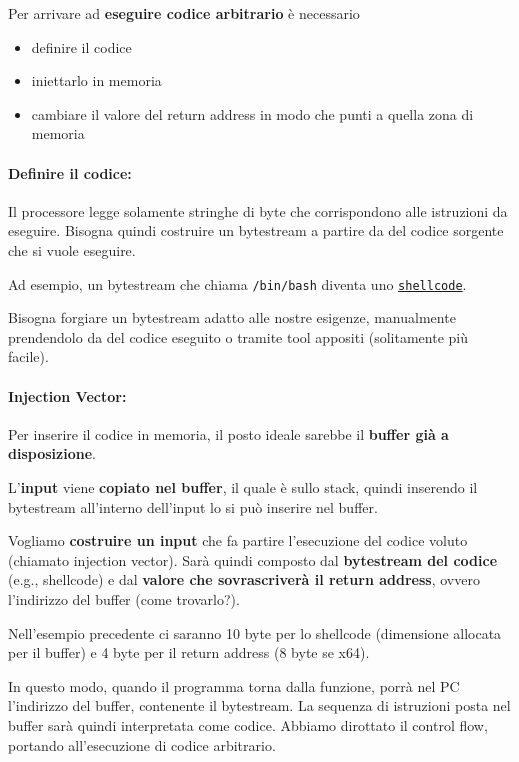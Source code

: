 Per arrivare ad \textbf{eseguire codice arbitrario} è necessario
\begin{itemize}
	\item definire il codice

	\item iniettarlo in memoria

	\item cambiare il valore del return address in modo che punti a quella zona di memoria
\end{itemize}

\paragraph{Definire il codice:} Il processore legge solamente stringhe di byte che corrispondono alle istruzioni da eseguire. Bisogna quindi costruire un bytestream a partire da del codice sorgente che si vuole eseguire. 

Ad esempio, un bytestream che chiama \texttt{/bin/bash} diventa uno \href{https://it.wikipedia.org/wiki/Shellcode}{\texttt{shellcode}}.

Bisogna forgiare un bytestream adatto alle nostre esigenze, manualmente prendendolo da del codice eseguito o tramite tool appositi (solitamente più facile).

\paragraph{Injection Vector:} Per inserire il codice in memoria, il posto ideale sarebbe il \textbf{buffer già a disposizione}. 

L'\textbf{input} viene \textbf{copiato nel buffer}, il quale è sullo stack, quindi inserendo il bytestream all'interno dell'input lo si può inserire nel buffer.

Vogliamo \textbf{costruire un input} che fa partire l'esecuzione del codice voluto (chiamato injection vector). Sarà quindi composto dal \textbf{bytestream del codice} (e.g., shellcode) e dal \textbf{valore che sovrascriverà il return address}, ovvero l'indirizzo del buffer (come trovarlo?).

Nell'esempio precedente ci saranno 10 byte per lo shellcode (dimensione allocata per il buffer) e 4 byte per il return address (8 byte se x64).

In questo modo, quando il programma torna dalla funzione, porrà nel PC l'indirizzo del buffer, contenente il bytestream. La sequenza di istruzioni posta nel buffer sarà quindi interpretata come codice. Abbiamo dirottato il control flow, portando all'esecuzione di codice arbitrario.

